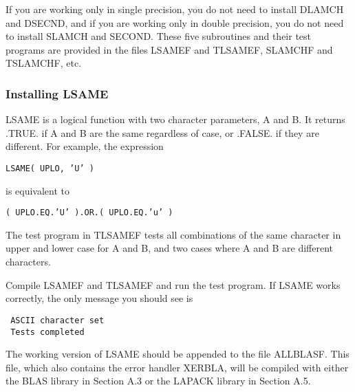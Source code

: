 \noindent
If you are working only in single precision, you do not need to install
DLAMCH and DSECND, and if you are working only in double precision,
you do not need to install SLAMCH and SECOND.
These five subroutines and their test programs are provided in the
files LSAMEF and TLSAMEF, SLAMCHF and TSLAMCHF, etc.

\subsubsection{Installing LSAME}
\dent
LSAME is a logical function with two character parameters, A and B.
It returns .TRUE. if A and B are the same regardless of case, or .FALSE.
if they are different.  For example, the expression

\begin{list}{}{}
\item {\tt LSAME( UPLO, 'U' )}
\end{list}

\noindent
is equivalent to

\begin{list}{}{}
\item {\tt ( UPLO.EQ.'U' ).OR.( UPLO.EQ.'u' )}
\end{list}

The test program in TLSAMEF tests all combinations of
the same character in upper and lower case for A and B, and two
cases where A and B are different characters. 

Compile LSAMEF and TLSAMEF and run the test program.
If LSAME works correctly, the only message you should see is
\begin{verbatim}
 ASCII character set
 Tests completed
\end{verbatim}
The working version of LSAME should be appended to the file ALLBLASF.
This file, which also contains the error handler XERBLA, will
be compiled with either the BLAS library in Section A.3 or the LAPACK
library in Section A.5.

